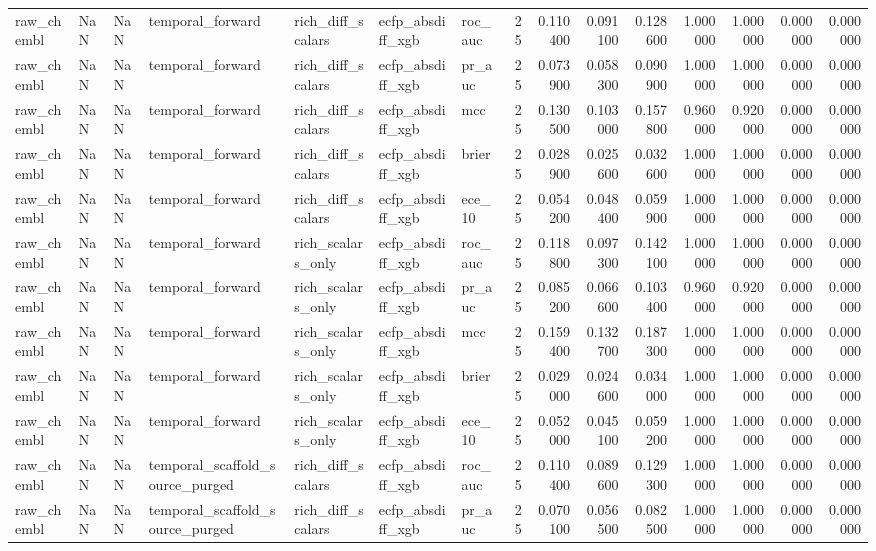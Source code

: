 \begin{longtable}{lllllllrrrrrrrr}
raw\_chembl & NaN & NaN & temporal\_forward & rich\_diff\_scalars & ecfp\_absdiff\_xgb & roc\_auc & 25 & 0.110400 & 0.091100 & 0.128600 & 1.000000 & 1.000000 & 0.000000 & 0.000000 \\
raw\_chembl & NaN & NaN & temporal\_forward & rich\_diff\_scalars & ecfp\_absdiff\_xgb & pr\_auc & 25 & 0.073900 & 0.058300 & 0.090900 & 1.000000 & 1.000000 & 0.000000 & 0.000000 \\
raw\_chembl & NaN & NaN & temporal\_forward & rich\_diff\_scalars & ecfp\_absdiff\_xgb & mcc & 25 & 0.130500 & 0.103000 & 0.157800 & 0.960000 & 0.920000 & 0.000000 & 0.000000 \\
raw\_chembl & NaN & NaN & temporal\_forward & rich\_diff\_scalars & ecfp\_absdiff\_xgb & brier & 25 & 0.028900 & 0.025600 & 0.032600 & 1.000000 & 1.000000 & 0.000000 & 0.000000 \\
raw\_chembl & NaN & NaN & temporal\_forward & rich\_diff\_scalars & ecfp\_absdiff\_xgb & ece\_10 & 25 & 0.054200 & 0.048400 & 0.059900 & 1.000000 & 1.000000 & 0.000000 & 0.000000 \\
raw\_chembl & NaN & NaN & temporal\_forward & rich\_scalars\_only & ecfp\_absdiff\_xgb & roc\_auc & 25 & 0.118800 & 0.097300 & 0.142100 & 1.000000 & 1.000000 & 0.000000 & 0.000000 \\
raw\_chembl & NaN & NaN & temporal\_forward & rich\_scalars\_only & ecfp\_absdiff\_xgb & pr\_auc & 25 & 0.085200 & 0.066600 & 0.103400 & 0.960000 & 0.920000 & 0.000000 & 0.000000 \\
raw\_chembl & NaN & NaN & temporal\_forward & rich\_scalars\_only & ecfp\_absdiff\_xgb & mcc & 25 & 0.159400 & 0.132700 & 0.187300 & 1.000000 & 1.000000 & 0.000000 & 0.000000 \\
raw\_chembl & NaN & NaN & temporal\_forward & rich\_scalars\_only & ecfp\_absdiff\_xgb & brier & 25 & 0.029000 & 0.024600 & 0.034000 & 1.000000 & 1.000000 & 0.000000 & 0.000000 \\
raw\_chembl & NaN & NaN & temporal\_forward & rich\_scalars\_only & ecfp\_absdiff\_xgb & ece\_10 & 25 & 0.052000 & 0.045100 & 0.059200 & 1.000000 & 1.000000 & 0.000000 & 0.000000 \\
raw\_chembl & NaN & NaN & temporal\_scaffold\_source\_purged & rich\_diff\_scalars & ecfp\_absdiff\_xgb & roc\_auc & 25 & 0.110400 & 0.089600 & 0.129300 & 1.000000 & 1.000000 & 0.000000 & 0.000000 \\
raw\_chembl & NaN & NaN & temporal\_scaffold\_source\_purged & rich\_diff\_scalars & ecfp\_absdiff\_xgb & pr\_auc & 25 & 0.070100 & 0.056500 & 0.082500 & 1.000000 & 1.000000 & 0.000000 & 0.000000 \\

\end{longtable}

